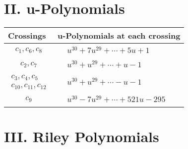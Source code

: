 \documentclass[1p]{elsarticle_modified}
\theoremstyle{definition}
\begin{document}
\centering \section*{ II. u-Polynomials}
\begin{tabular}{m{50pt}|m{274pt}}
Crossings & \hspace{64pt}u-Polynomials at each crossing \\
\hline $$\begin{aligned}c_{1},c_{6},c_{8}\end{aligned}$$&$\begin{aligned}
&u^{30}+7 u^{29}+\cdots+5 u+1
\end{aligned}$\\
\hline $$\begin{aligned}c_{2},c_{7}\end{aligned}$$&$\begin{aligned}
&u^{30}+u^{29}+\cdots+u-1
\end{aligned}$\\
\hline $$\begin{aligned}c_{3},c_{4},c_{5}\\c_{10},c_{11},c_{12}\end{aligned}$$&$\begin{aligned}
&u^{30}+u^{29}+\cdots- u-1
\end{aligned}$\\
\hline $$\begin{aligned}c_{9}\end{aligned}$$&$\begin{aligned}
&u^{30}-7 u^{29}+\cdots+521 u-295
\end{aligned}$\\
\hline
\end{tabular}\newpage\renewcommand{\arraystretch}{1}
\centering \section*{ III. Riley Polynomials}
\end{document}
